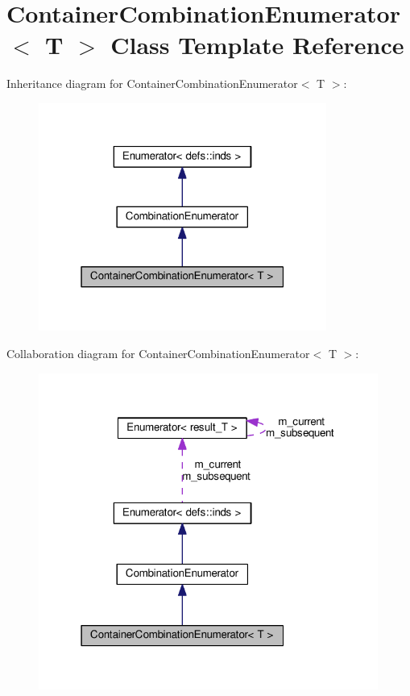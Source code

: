 \hypertarget{classContainerCombinationEnumerator}{}\section{Container\+Combination\+Enumerator$<$ T $>$ Class Template Reference}
\label{classContainerCombinationEnumerator}


Inheritance diagram for Container\+Combination\+Enumerator$<$ T $>$\+:
\nopagebreak
\begin{figure}[H]
\begin{center}
\leavevmode
\includegraphics[width=268pt]{classContainerCombinationEnumerator__inherit__graph}
\end{center}
\end{figure}


Collaboration diagram for Container\+Combination\+Enumerator$<$ T $>$\+:
\nopagebreak
\begin{figure}[H]
\begin{center}
\leavevmode
\includegraphics[width=316pt]{classContainerCombinationEnumerator__coll__graph}
\end{center}
\end{figure}
